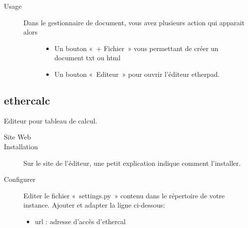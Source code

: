 \documentclass[letterpaper,10pt,french]{sphinxmanual}
\begin{document}
\begin{sphinxVerbatim}[commandchars=\\\{\}]
     
\end{sphinxVerbatim}
\begin{description}
\item[{Usage}] \leavevmode\begin{description}
\item[{Dans le gestionnaire de document, vous avez plusieurs action qui apparait alors}] \leavevmode\begin{itemize}
\item {} 
Un bouton « + Fichier » vous permettant de créer un document txt ou html

\item {} 
Un bouton « Editeur » pour ouvrir l’éditeur etherpad.

\end{itemize}

\end{description}

\end{description}

\noindent{}


\subsection{ethercalc}
\label{\detokenize{documents/editor:ethercalc}}
Editeur pour tableau de calcul.
\begin{description}
\item[{Site Web}] \leavevmode
{}

\item[{Installation}] \leavevmode
Sur le site de l’éditeur, une petit explication indique comment l’installer.

\item[{Configurer}] \leavevmode
Editer le fichier « settings.py » contenu dans le répertoire de votre instance.
Ajouter et adapter la ligne ci-dessous:
\begin{itemize}
\item {} 
url : adresse d’accès d’ethercal

\end{itemize}

\end{description}
\end{document}
